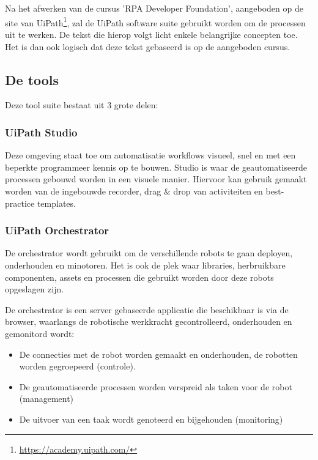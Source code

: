 \chapter{}
\label{ch:implementatie}

Na het afwerken van de cursus 'RPA Developer Foundation', aangeboden op de site van UiPath\footnote{\url{https://academy.uipath.com/}}, zal de UiPath software suite gebruikt worden om de processen uit te werken. De tekst die hierop volgt licht enkele belangrijke concepten toe. Het is dan ook logisch dat deze tekst gebaseerd is op de aangeboden cursus.

\section{De tools}
Deze tool suite bestaat uit 3 grote delen:

\subsection{UiPath Studio}
Deze omgeving staat toe om automatisatie workflows visueel, snel en met een beperkte programmeer kennis op te bouwen. Studio is waar de geautomatiseerde processen gebouwd worden in een visuele manier. Hiervoor kan gebruik gemaakt worden van de ingebouwde recorder, drag \& drop van activiteiten en best-practice templates.

\subsection{UiPath Orchestrator}
De orchestrator wordt gebruikt om de verschillende robots te gaan deployen, onderhouden en minotoren. Het is ook de plek waar libraries, herbruikbare componenten, assets en processen die gebruikt worden door deze robots opgeslagen zijn.

De orchestrator is een server gebaseerde applicatie die beschikbaar is via de browser, waarlangs de robotische werkkracht gecontrolleerd, onderhouden en gemonitord wordt:
\begin{itemize}
	\item De connecties met de robot worden gemaakt en onderhouden, de robotten worden gegroepeerd (controle).
	\item De geautomatiseerde processen worden verspreid als taken voor de robot (management)
	\item De uitvoer van een taak wordt genoteerd en bijgehouden (monitoring)
\end{itemize}

